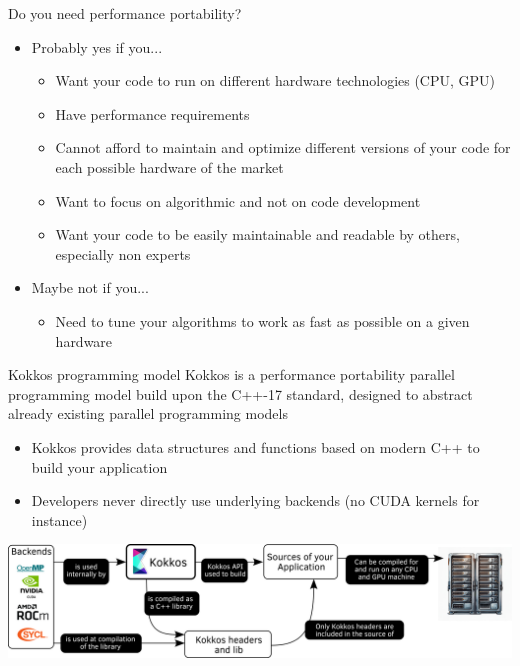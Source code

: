 \documentclass[aspectratio=169]{beamer}
\begin{document}
\begin{frame}{Do you need performance portability?}
    \begin{itemize}
        \item Probably yes if you...
        \begin{itemize}
            \item Want your code to run on different hardware technologies (CPU, GPU)
            \item Have performance requirements
            \item Cannot afford to maintain and optimize different versions of your code for each possible hardware of the market
            \item Want to focus on algorithmic and not on code development
            \item Want your code to be easily maintainable and readable by others, especially non experts
        \end{itemize}
        \item Maybe not if you...
        \begin{itemize}
            \item Need to tune your algorithms to work as fast as possible on a given hardware
        \end{itemize}
    \end{itemize}
\end{frame}


\begin{frame}{Kokkos programming model}
    Kokkos is a performance portability parallel programming model build upon the C++-17 standard, designed to abstract already existing parallel programming models

    \vspace{0.5em}

    \begin{itemize}
        \item Kokkos provides data structures and functions based on modern C++ to build your application
        \item Developers never directly use underlying backends (no CUDA kernels for instance)
    \end{itemize}
    \begin{center}
        \includegraphics[width=1\textwidth]{kokkos_model.png}
    \end{center}
\end{frame}
\end{document}
